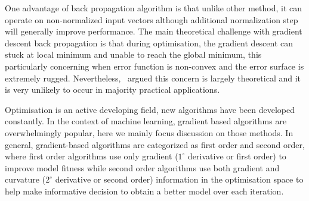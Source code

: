 One advantage of back propagation algorithm is that unlike other method, it can operate on non-normalized input vectors although additional normalization step will generally improve performance. \cite{Buckland:2002} The main theoretical challenge with gradient descent back propagation is that during optimisation, the gradient descent can stuck at local minimum and unable to reach the global minimum, this particularly concerning when error function is non-convex and the error surface is extremely rugged. Nevertheless,~\citet{LeCun_2015} argued this concern is largely theoretical and it is very unlikely to occur in majority practical applications.

Optimisation is an active developing field, new algorithms have been developed constantly. In the context of machine learning, gradient based algorithms are overwhelmingly popular, here we mainly focus discussion on those methods. In general, gradient-based algorithms are categorized as first order and second order, where first order algorithms use only gradient ($1^\circ$ derivative or first order) to improve model fitness while second order algorithms use both gradient and curvature ($2^\circ$ derivative or second order) information in the optimisation space to help make informative decision to obtain a better model over each iteration. \\

